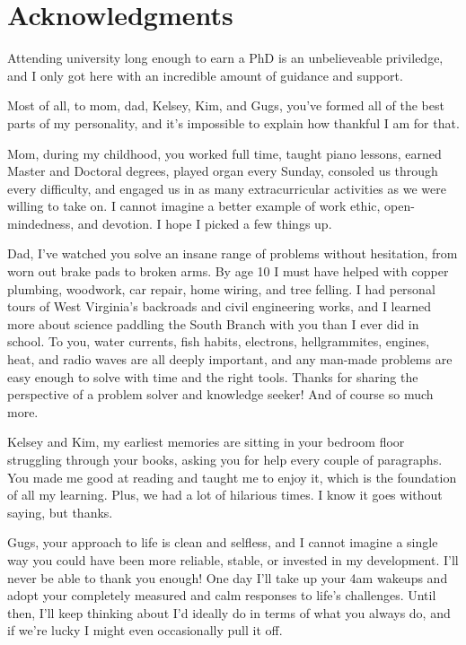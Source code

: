
\chapter{Acknowledgments}

Attending university long enough to earn a PhD is an unbelieveable priviledge, and I only got here with an incredible amount of guidance and support.

Most of all, to mom, dad, Kelsey, Kim, and Gugs, you've formed all of the best parts of my personality, and it's impossible to explain how thankful I am for that.

Mom, during my childhood, you worked full time, taught piano lessons, earned Master and Doctoral degrees, played organ every Sunday, consoled us through every difficulty, and engaged us in as many extracurricular activities as we were willing to take on. 
I cannot imagine a better example of work ethic, open-mindedness, and devotion. I hope I picked a few things up. 

Dad, I've watched you solve an insane range of problems without hesitation, from worn out brake pads to broken arms.
By age 10 I must have helped with copper plumbing, woodwork, car repair, home wiring, and tree felling.
I had personal tours of West Virginia's backroads and civil engineering works, and I learned more about science paddling the South Branch with you than I ever did in school.
To you, water currents, fish habits, electrons, hellgrammites, engines, heat, and radio waves are all deeply important, and any man-made problems are easy enough to solve with time and the right tools.
Thanks for sharing the perspective of a problem solver and knowledge seeker! And of course so much more.

Kelsey and Kim, my earliest memories are sitting in your bedroom floor struggling through your books, asking you for help every couple of paragraphs. You made me good at reading and taught me to enjoy it, which is the foundation of all my learning. Plus, we had a lot of hilarious times. I know it goes without saying, but thanks.

Gugs, your approach to life is clean and selfless, and I cannot imagine a single way you could have been more reliable, stable, or invested in my development.
I'll never be able to thank you enough!
One day I'll take up your 4am wakeups and adopt your completely measured and calm responses to life's challenges. Until then, I'll keep thinking about I'd ideally do in terms of what you always do, and if we're lucky I might even occasionally pull it off.

